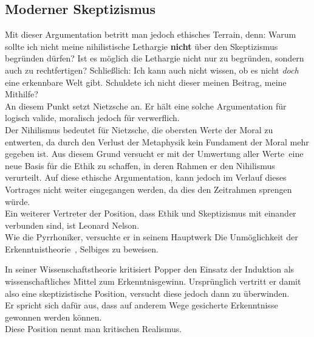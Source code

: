 \documentclass[12pt,a4paper]{article}
\begin{document}
	\subsection{Moderner Skeptizismus}
Mit dieser Argumentation betritt man jedoch ethisches Terrain, denn: Warum sollte ich nicht meine nihilistische Lethargie \textbf{nicht} über den Skeptizismus begründen dürfen? Ist es möglich die Lethargie nicht nur zu begründen, sondern auch zu rechtfertigen? Schließlich: Ich kann auch nicht wissen, ob es nicht \emph{doch} eine erkennbare Welt gibt. Schuldete ich nicht dieser meinen Beitrag, meine Mithilfe?\\
An diesem Punkt setzt Nietzsche an. Er hält eine solche Argumentation für logisch valide, moralisch jedoch für verwerflich.\\%
Der Nihilismus bedeutet für Nietzsche, die obersten Werte der Moral zu entwerten, da durch den Verlust der Metaphysik kein Fundament der Moral mehr gegeben ist. Aus diesem Grund versucht er mit der \glqq Umwertung aller Werte\grqq\ eine neue Basis für die Ethik zu schaffen, in deren Rahmen er den Nihilismus verurteilt. Auf diese ethische Argumentation, kann jedoch im Verlauf dieses Vortrages nicht weiter eingegangen werden, da dies den Zeitrahmen sprengen würde.\\
Ein weiterer Vertreter der Position, dass Ethik und Skeptizismus mit einander verbunden sind, ist Leonard Nelson.\\
Wie die Pyrrhoniker, versuchte er in seinem Hauptwerk \glqq Die Unmöglichkeit der Erkenntnistheorie\grqq\ , Selbiges zu beweisen.

In seiner Wissenschaftstheorie kritisiert Popper den Einsatz der Induktion als wissenschaftliches Mittel zum Erkenntnisgewinn. Ursprünglich vertritt er damit also eine skeptizistische Position, versucht diese jedoch dann zu überwinden.\\
Er spricht sich dafür aus, dass auf anderem Wege gesicherte Erkenntnisse gewonnen werden können.\\
Diese Position nennt man kritischen Realismus.%
%
%
\end{document}
